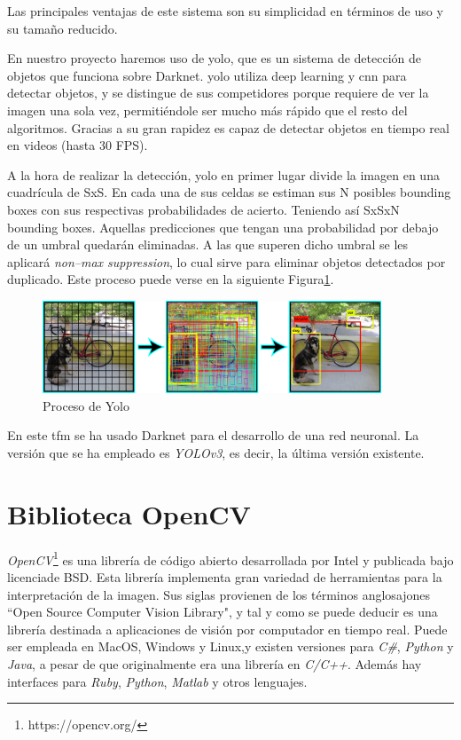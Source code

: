 Las principales ventajas de este sistema son su simplicidad en términos de uso y su tama\~{n}o reducido.

En nuestro proyecto haremos uso de \acrfull{yolo}, que es un sistema de detección de objetos que funciona sobre Darknet. \acrshort{yolo} utiliza deep learning y \acrshort{cnn} para detectar objetos, y se distingue de sus competidores porque requiere de ver la imagen una sola vez, permitiéndole ser mucho más rápido que el resto del algoritmos. Gracias a su gran rapidez es capaz de detectar objetos en tiempo real en videos (hasta 30 FPS).

A la hora de realizar la detección, \acrshort{yolo} en primer lugar divide la imagen en una cuadrícula de SxS. En cada una de sus celdas se estiman sus N posibles bounding boxes  con sus respectivas probabilidades de acierto. Teniendo así SxSxN bounding boxes. Aquellas predicciones que tengan una probabilidad por debajo de un umbral quedarán eliminadas. A las que superen dicho umbral se les aplicará \textit{non--max suppression}, lo cual sirve para eliminar objetos detectados por duplicado. Este proceso puede verse en la siguiente Figura\ref{fig.yolo}.

\begin{figure}[H]
  \begin{center}
    \includegraphics[width=0.9\textwidth]{figures/Herramientas/yolo.png}
		\caption{Proceso de Yolo}
		\label{fig.yolo}
		\end{center}
\end{figure}

En este \acrshort{tfm} se ha usado Darknet para el desarrollo de una red neuronal. La versión que se ha empleado es \textit{YOLOv3}, es decir, la última versión existente.

\section{Biblioteca OpenCV}

\textit{OpenCV}\footnote{https://opencv.org/} es una librería de código abierto desarrollada por Intel y publicada  bajo licenciade BSD. Esta librería implementa gran variedad de herramientas para la interpretación de la imagen. Sus  siglas  provienen  de  los  términos anglosajones ``Open Source Computer  Vision Library", y tal y como se puede deducir es una librería destinada a aplicaciones de visión por computador en tiempo real. Puede ser empleada en MacOS, Windows y Linux,y existen versiones para \textit{C\#}, \textit{Python} y \textit{Java}, a pesar de que originalmente era una librería en \textit{C/C++}. Además hay interfaces para \textit{Ruby}, \textit{Python}, \textit{Matlab} y otros lenguajes. 

